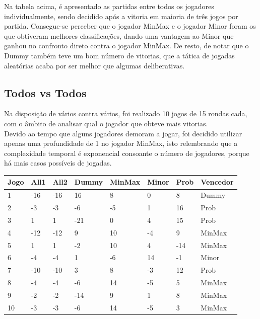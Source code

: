 \documentclass[12pt]{article}
\begin{document}
    Na tabela acima, é apresentado as partidas entre todos os jogadores individualmente, sendo decidido após a vitoria em maioria de três jogos por partida. Consegue-se perceber que o jogador MinMax e o jogador Minor foram os que obtiveram melhores classificações, dando uma vantagem ao Minor que ganhou no confronto direto contra o jogador MinMax. De resto, de notar que o Dummy também teve um bom número de vitorias, que a tática de jogadas aleatórias acaba por ser melhor que algumas deliberativas.\\
	
	\subsection*{Todos vs Todos}
    Na disposição de vários contra vários, foi realizado 10 jogos de 15 rondas cada, com o âmbito de analisar qual o jogador que obteve mais vitorias.\\
    Devido ao tempo que alguns jogadores demoram a jogar, foi decidido utilizar apenas uma profundidade de 1 no jogador MinMax, isto relembrando que a complexidade temporal é exponencial consoante o número de jogadores, porque há mais casos possíveis de jogadas.\\

    
    
	\begin{center}
	    \begin{tabular}{ |p{1.5cm}|p{1.5cm}|p{1.5cm}|p{1.5cm}|p{1.5cm}|p{1.5cm}|p{1.5cm}|p{2cm}|  }
	    \hline
	    Jogo & All1	& All2	& Dummy & MinMax & Minor & Prob & Vencedor\\\hline
	    1	& -16	& -16	& 16	& 8	    & 0	    & 8	    & Dummy\\\hline
        2	& -3	& -3	& -6	& -5	& 1	    & 16	& Prob\\\hline
        3	& 1	    & 1	    & -21	& 0     & 4	    & 15	& Prob\\\hline
        4	& -12	& -12	& 9	    &10     & -4	& 9	    & MinMax\\\hline
        5	& 1	    & 1	    & -2	& 10	& 4	    & -14	& MinMax\\\hline
        6	& -4	& -4	& 1	    & -6	& 14	& -1	& Minor\\\hline
        7	& -10	& -10	& 3	    & 8	    & -3	& 12	& Prob\\\hline
        8	& -4	& -4	& -6	& 14	&-5	    & 5	    & MinMax\\\hline
        9	& -2	& -2	& -14	& 9	    & 1	    & 8	    & MinMax\\\hline
        10	& -3	& -3	& -6	& 14	&-5	    & 3	    & MinMax\\\hline
	    \end{tabular}
	\end{center}
	
\end{document}
